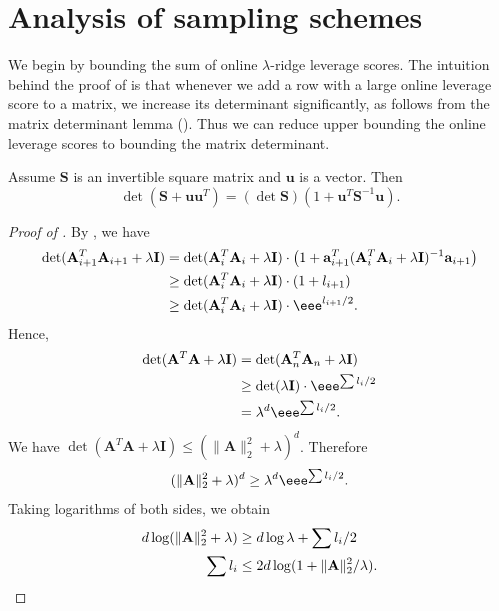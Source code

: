 \documentclass{toc}
\newcommand{\bv}[1]{\mathbf{#1}}
\begin{document}
\section{Analysis of sampling schemes}
\label{sec:sampling}

We begin by bounding the sum of online $\lambda$-ridge leverage scores.
The intuition behind the proof of  is that whenever we add a row with a large online leverage score to a matrix, we increase its determinant significantly, as follows from the matrix determinant lemma ().
Thus we can reduce upper bounding the online leverage scores to bounding the matrix determinant.
\begin{lemma}
    \label{lem:matdet}
    Assume $\bv{S}$ is an invertible square matrix and $\bv{u}$ is a vector.
    Then
    $$
        \det(\bv{S} + \bv{u}\bv{u}^T) = (\det \bv{S})(1 + \bv{u}^T\bv{S}^{-1}\bv{u}).
    $$
\end{lemma}

\begin{proof}[Proof of ]
    By , we have
    \begin{align*}
        \det (\bv{A}_{i+1}^T\bv{A}_{i+1} + \lambda \bv{I}) &= \det (\bv{A}_i^T \bv{A}_i + \lambda \bv{I}) \cdot \left(1 + \bv{a}_{i+1}^T (\bv{A}_i^T \bv{A}_i + \lambda \bv{I})^{-1} \bv{a}_{i+1}\right)\\
                                           &\geq \det (\bv{A}_i^T \bv{A}_i + \lambda \bv{I}) \cdot (1 + l_{i+1})\\
                                           &\geq \det (\bv{A}_i^T \bv{A}_i + \lambda \bv{I}) \cdot \eee^{l_{i+1} / 2}.
    \end{align*}
    Hence,
    \begin{align*}
        \det (\bv{A}^T \bv{A} + \lambda \bv{I}) &= \det (\bv{A}_n^T \bv{A}_n + \lambda \bv{I})\\
                               &\geq \det (\lambda \bv{I}) \cdot \eee^{\sum l_i / 2}\\
                               &= \lambda^d \eee^{\sum l_i / 2}.
    \end{align*}
    We have $\det (\bv{A}^T \bv{A} + \lambda \bv{I}) \leq (\|\bv{A}\|_2^2 + \lambda)^d$.
    Therefore
    \begin{align*}
        (\|\bv{A}\|_2^2+\lambda)^d \geq \lambda^d \eee^{\sum l_i / 2}.
    \end{align*}
    Taking logarithms of both sides, we obtain
    \begin{align*}
          d \log (\|\bv{A}\|_2^2 + \lambda) &\geq d \log \lambda + \sum l_i / 2\\
   \sum l_i &\leq 2 d \log (1 + \|\bv{A}\|_2^2/\lambda).\qedhere
    \end{align*}
\end{proof}
%
\end{document}
